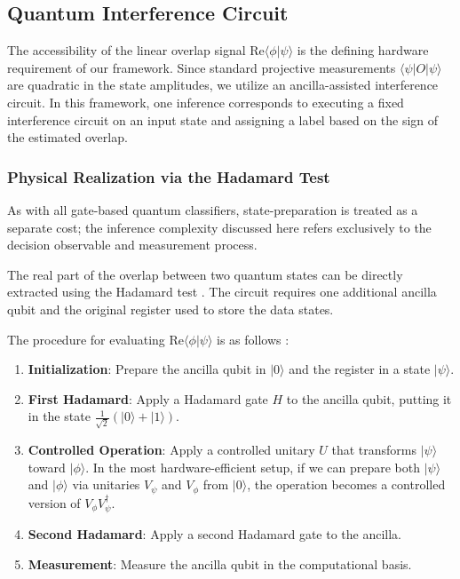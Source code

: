 \documentclass[conference]{IEEEtran}
\begin{document}
\subsection{Quantum Interference Circuit}
The accessibility of the linear overlap signal $\mathrm{Re}\langle \phi | \psi \rangle$ is the defining hardware requirement of our framework. Since standard projective measurements $\langle \psi | O | \psi \rangle$ are quadratic in the state amplitudes, we utilize an ancilla-assisted interference circuit. In this framework, one inference corresponds to executing a fixed interference circuit on an input state and assigning a label based on the sign of the estimated overlap.

\subsubsection{Physical Realization via the Hadamard Test}
As with all gate-based quantum classifiers, state-preparation is treated as a separate cost; the inference complexity discussed here refers exclusively to the decision observable and measurement process.

The real part of the overlap between two quantum states can be directly extracted using the Hadamard test \cite{ekert2002direct}. The circuit requires one additional ancilla qubit and the original register used to store the data states.

The procedure for evaluating $\mathrm{Re}\langle \phi | \psi \rangle$ is as follows \cite{ekert2002direct}:
\begin{enumerate}
    \item \textbf{Initialization}: Prepare the ancilla qubit in $|0\rangle$ and the register in a state $|\psi\rangle$.
    \item \textbf{First Hadamard}: Apply a Hadamard gate $H$ to the ancilla qubit, putting it in the state $\frac{1}{\sqrt{2}}(|0\rangle + |1\rangle)$.
    \item \textbf{Controlled Operation}: Apply a controlled unitary $U$ that transforms $|\psi\rangle$ toward $|\phi\rangle$. In the most hardware-efficient setup, if we can prepare both $|\psi\rangle$ and $|\phi\rangle$ via unitaries $V_\psi$ and $V_\phi$ from $|0\rangle$, the operation becomes a controlled version of $V_\phi V_\psi^\dagger$.
    \item \textbf{Second Hadamard}: Apply a second Hadamard gate to the ancilla.
    \item \textbf{Measurement}: Measure the ancilla qubit in the computational basis.
\end{enumerate}
\end{document}
